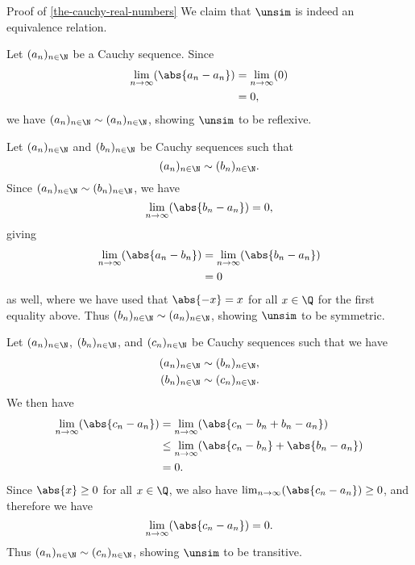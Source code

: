 \begin{Proof}{Proof of \cref{the-cauchy-real-numbers}}%
    We claim that $\unsim$ is indeed an equivalence relation.

    Let $(a_{n})_{n\in\N}$ be a Cauchy sequence. Since
    \begin{align*}
        \lim_{n\to\infty}(\abs{a_{n}-a_{n}}) &= \lim_{n\to\infty}(0)\\
                                             &= 0,
    \end{align*}
    we have $(a_{n})_{n\in\N}\sim(a_{n})_{n\in\N}$, showing $\unsim$ to be reflexive.

    Let $(a_{n})_{n\in\N}$ and $(b_{n})_{n\in\N}$ be Cauchy sequences such that
    \[
        (a_{n})_{n\in\N}%
        \sim%
        (b_{n})_{n\in\N}.%
    \]%
    Since $(a_{n})_{n\in\N}\sim(b_{n})_{n\in\N}$, we have
    \[
        \lim_{n\to\infty}(\abs{b_{n}-a_{n}})%
        =%
        0,%
    \]%
    giving
    \begin{align*}
        \lim_{n\to\infty}(\abs{a_{n}-b_{n}}) &= \lim_{n\to\infty}(\abs{b_{n}-a_{n}})\\
                                             &= 0
    \end{align*}
    as well, where we have used that $\abs{-x}=x$ for all $x\in\Q$ for the first equality above. Thus $(b_{n})_{n\in\N}\sim(a_{n})_{n\in\N}$, showing $\unsim$ to be symmetric.

    Let $(a_{n})_{n\in\N}$, $(b_{n})_{n\in\N}$, and $(c_{n})_{n\in\N}$ be Cauchy sequences such that we have
    \begin{align*}
        (a_{n})_{n\in\N} &\sim (b_{n})_{n\in\N},\\
        (b_{n})_{n\in\N} &\sim (c_{n})_{n\in\N}.
    \end{align*}
    We then have
    \begin{align*}
        \lim_{n\to\infty}(\abs{c_{n}-a_{n}}) &=    \lim_{n\to\infty}(\abs{c_{n}-b_{n}+b_{n}-a_{n}})\\
                                             &\leq \lim_{n\to\infty}(\abs{c_{n}-b_{n}}+\abs{b_{n}-a_{n}})\\
                                             &=    0.
    \end{align*}
    Since $\abs{x}\geq0$ for all $x\in\Q$, we also have $\lim_{n\to\infty}(\abs{c_{n}-a_{n}})\geq0$, and therefore we have
    \[
        \lim_{n\to\infty}(\abs{c_{n}-a_{n}})%
        =%
        0.%
    \]%
    Thus $(a_{n})_{n\in\N}\sim(c_{n})_{n\in\N}$, showing $\unsim$ to be transitive.
\end{Proof}
